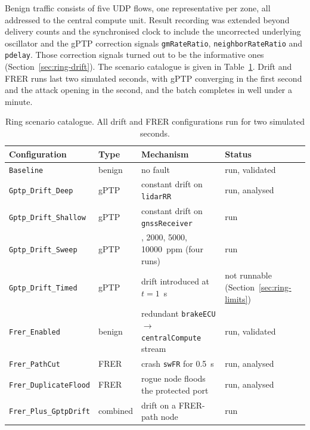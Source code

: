 Benign traffic consists of five UDP flows, one representative per zone, all addressed
to the central compute unit. Result recording was extended beyond delivery counts and
the synchronised clock to include the uncorrected underlying oscillator and the gPTP
correction signals \texttt{gmRateRatio}, \texttt{neighborRateRatio} and
\texttt{pdelay}. Those correction signals turned out to be the informative ones
(Section~\ref{sec:ring-drift}). The scenario catalogue is given in
Table~\ref{tab:ring-catalogue}. Drift and FRER runs last two simulated seconds, with
gPTP converging in the first second and the attack opening in the second, and the batch
completes in well under a minute.

\begin{table}[htbp]
\centering
\caption{Ring scenario catalogue. All drift and FRER configurations run for two simulated seconds.}
\label{tab:ring-catalogue}
\vspace{0.8em}
\small\setlength{\tabcolsep}{4pt}
\begin{tabular}{>{\raggedright\arraybackslash}p{} >{\raggedright\arraybackslash}p{} >{\raggedright\arraybackslash}p{} >{\raggedright\arraybackslash}p{}}
\toprule
\textbf{Configuration} & \textbf{Type} & \textbf{Mechanism} & \textbf{Status} \\
\midrule
\texttt{Baseline} & benign & no fault & run, validated \\
\texttt{Gptp\_Drift\_Deep} & gPTP & constant drift on \texttt{lidarRR} & run, analysed \\
\texttt{Gptp\_Drift\_Shallow} & gPTP & constant drift on \texttt{gnssReceiver} & run \\
\texttt{Gptp\_Drift\_Sweep} & gPTP & 500, 2000, 5000, 10000~ppm (four runs) & run \\
\texttt{Gptp\_Drift\_Timed} & gPTP & drift introduced at $t=1$~s & not runnable (Section~\ref{sec:ring-limits}) \\
\texttt{Frer\_Enabled} & benign & redundant \texttt{brakeECU} $\rightarrow$ \texttt{centralCompute} stream & run, validated \\
\texttt{Frer\_PathCut} & FRER & crash \texttt{swFR} for 0.5~s & run, analysed \\
\texttt{Frer\_DuplicateFlood} & FRER & rogue node floods the protected port & run, analysed \\
\texttt{Frer\_Plus\_GptpDrift} & combined & drift on a FRER-path node & run \\
\bottomrule
\end{tabular}
\end{table}

